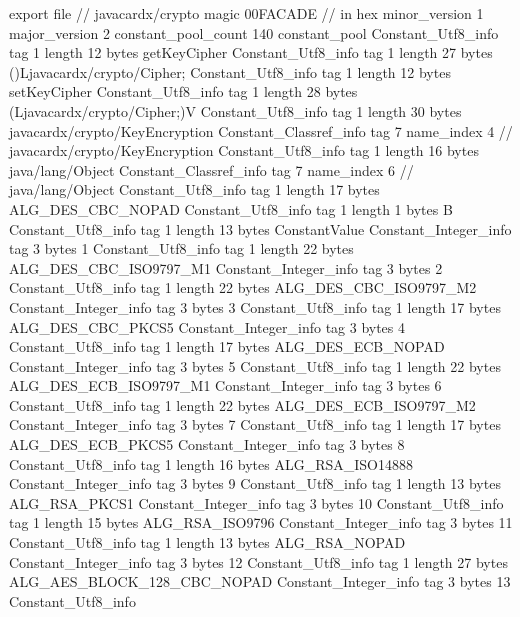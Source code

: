 export file {		// javacardx/crypto
	magic	00FACADE		 // in hex
	minor_version	1
	major_version	2
	constant_pool_count	140
	constant_pool {
		Constant_Utf8_info {
			tag	1
			length	12
			bytes	getKeyCipher
		}
		Constant_Utf8_info {
			tag	1
			length	27
			bytes	()Ljavacardx/crypto/Cipher;
		}
		Constant_Utf8_info {
			tag	1
			length	12
			bytes	setKeyCipher
		}
		Constant_Utf8_info {
			tag	1
			length	28
			bytes	(Ljavacardx/crypto/Cipher;)V
		}
		Constant_Utf8_info {
			tag	1
			length	30
			bytes	javacardx/crypto/KeyEncryption
		}
		Constant_Classref_info {
			tag	7
			name_index	4		// javacardx/crypto/KeyEncryption
		}
		Constant_Utf8_info {
			tag	1
			length	16
			bytes	java/lang/Object
		}
		Constant_Classref_info {
			tag	7
			name_index	6		// java/lang/Object
		}
		Constant_Utf8_info {
			tag	1
			length	17
			bytes	ALG_DES_CBC_NOPAD
		}
		Constant_Utf8_info {
			tag	1
			length	1
			bytes	B
		}
		Constant_Utf8_info {
			tag	1
			length	13
			bytes	ConstantValue
		}
		Constant_Integer_info {
			tag	3
			bytes	1
		}
		Constant_Utf8_info {
			tag	1
			length	22
			bytes	ALG_DES_CBC_ISO9797_M1
		}
		Constant_Integer_info {
			tag	3
			bytes	2
		}
		Constant_Utf8_info {
			tag	1
			length	22
			bytes	ALG_DES_CBC_ISO9797_M2
		}
		Constant_Integer_info {
			tag	3
			bytes	3
		}
		Constant_Utf8_info {
			tag	1
			length	17
			bytes	ALG_DES_CBC_PKCS5
		}
		Constant_Integer_info {
			tag	3
			bytes	4
		}
		Constant_Utf8_info {
			tag	1
			length	17
			bytes	ALG_DES_ECB_NOPAD
		}
		Constant_Integer_info {
			tag	3
			bytes	5
		}
		Constant_Utf8_info {
			tag	1
			length	22
			bytes	ALG_DES_ECB_ISO9797_M1
		}
		Constant_Integer_info {
			tag	3
			bytes	6
		}
		Constant_Utf8_info {
			tag	1
			length	22
			bytes	ALG_DES_ECB_ISO9797_M2
		}
		Constant_Integer_info {
			tag	3
			bytes	7
		}
		Constant_Utf8_info {
			tag	1
			length	17
			bytes	ALG_DES_ECB_PKCS5
		}
		Constant_Integer_info {
			tag	3
			bytes	8
		}
		Constant_Utf8_info {
			tag	1
			length	16
			bytes	ALG_RSA_ISO14888
		}
		Constant_Integer_info {
			tag	3
			bytes	9
		}
		Constant_Utf8_info {
			tag	1
			length	13
			bytes	ALG_RSA_PKCS1
		}
		Constant_Integer_info {
			tag	3
			bytes	10
		}
		Constant_Utf8_info {
			tag	1
			length	15
			bytes	ALG_RSA_ISO9796
		}
		Constant_Integer_info {
			tag	3
			bytes	11
		}
		Constant_Utf8_info {
			tag	1
			length	13
			bytes	ALG_RSA_NOPAD
		}
		Constant_Integer_info {
			tag	3
			bytes	12
		}
		Constant_Utf8_info {
			tag	1
			length	27
			bytes	ALG_AES_BLOCK_128_CBC_NOPAD
		}
		Constant_Integer_info {
			tag	3
			bytes	13
		}
		Constant_Utf8_info {
}}}
